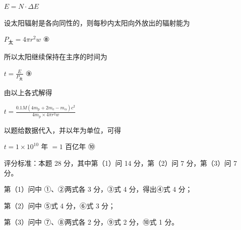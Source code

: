 \documentclass[\gkver]{gaokaozhenti}
\begin{document}
\begin{enumerate}
{$E=N\cdot\Delta E$

设太阳辐射是各向同性的，则每秒内太阳向外放出的辐射能为

$P_{\text{太}}=4\pi r^{2}w$ ⑧

所以太阳继续保持在主序的时间为

$t=\frac{E}{P_{\text{太}}}$ ⑨

由以上各式解得

$t=\frac{0.1M(4m_{\mathrm{p}}+2m_{\mathrm{e}}-m_{\alpha})c^{2}}{4m_{\mathrm{p}}\times4\pi r^{2}w}$

以题给数据代入，并以年为单位，可得

$t=1\times10^{10}$ 年 $=1$ 百亿年 ⑩

评分标准：本题 28 分，其中第（1）问 14 分，第（2）问 7 分，第（3）问 7 分。

第（1）问中 ①、②两式各 3 分，③式 4 分，得出④式 4 分；

第（2）问中 ⑤式 4 分，⑥式 3 分；

第（3）问中 ⑦、⑧两式各 2 分，⑨式 2 分，⑩式 1 分。
}

\end{enumerate}
\end{document}
